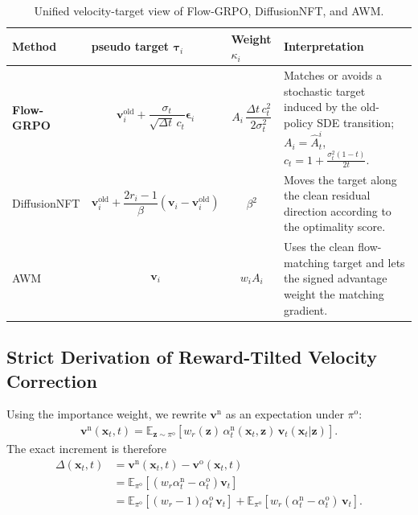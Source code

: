 \documentclass{article} %
\begin{document}
\begin{table}[H]
\centering
\caption{Unified velocity-target view of Flow-GRPO, DiffusionNFT, and AWM.}
\label{tab:velocity_target_comparison}
\renewcommand{\arraystretch}{1.45}
\setlength{\tabcolsep}{5pt}
\small
\begin{tabularx}{\textwidth}{
@{}
>{\bfseries\centering\arraybackslash}m{}
>{\centering\arraybackslash}m{}
>{\centering\arraybackslash}m{}
Y
@{}}
\toprule
Method
&
pseudo target $\mathbf{\tau}_i$
&
Weight $\kappa_i$
&
Interpretation
\\
\midrule

Flow-GRPO
&
\[
\mathbf{v}_i^{\mathrm{old}}
+
\frac{\sigma_t}{\sqrt{\Delta t}\,c_t}
\boldsymbol{\epsilon}_i
\]
&
\[
A_i\,
\frac{\Delta t\,c_t^2}{2\sigma_t^2}
\]
&
Matches or avoids a stochastic target induced by the old-policy SDE transition;
$A_i=\hat A^i_t$, $c_t=1+\frac{\sigma_t^2(1-t)}{2t}$.
\\

\midrule

DiffusionNFT
&
\[
\mathbf{v}_i^{\mathrm{old}}
+
\frac{2r_i-1}{\beta}
\left(
\mathbf{v}_i-\mathbf{v}_i^{\mathrm{old}}
\right)
\]
&
\[
\beta^2
\]
&
Moves the target along the clean residual direction according to the optimality score.
\\

\midrule

AWM
&
\[
\mathbf{v}_i
\]
&
\[
w_i A_i
\]
&
Uses the clean flow-matching target and lets the signed advantage weight the matching gradient.
\\

\bottomrule
\end{tabularx}
\end{table}

\subsection{Strict Derivation of Reward-Tilted Velocity Correction}
\label{sec:strict_correction}


Using the importance weight, we rewrite $\mathbf{v}^{\mathrm{n}}$ as an
expectation under $\pi^{\mathrm{o}}$:
\begin{align}
\mathbf{v}^{\mathrm{n}}(\mathbf{x}_t,t)
=
\mathbb{E}_{\mathbf{z}\sim\pi^{\mathrm{o}}}
\left[
w_r(\mathbf{z})\,
\alpha_t^{\mathrm{n}}(\mathbf{x}_t,\mathbf{z})\,
\mathbf{v}_t(\mathbf{x}_t|\mathbf{z})
\right].
\end{align}
The exact increment is therefore
\begin{align}
\Delta(\mathbf{x}_t,t)
&=
\mathbf{v}^{\mathrm{n}}(\mathbf{x}_t,t)
-
\mathbf{v}^{\mathrm{o}}(\mathbf{x}_t,t)
\\
&=
\mathbb{E}_{\pi^{\mathrm{o}}}
\left[
\left(
w_r\alpha_t^{\mathrm{n}}
-
\alpha_t^{\mathrm{o}}
\right)
\mathbf{v}_t
\right]
\\
&=
\mathbb{E}_{\pi^{\mathrm{o}}}
\left[
(w_r-1)\alpha_t^{\mathrm{o}}\,
\mathbf{v}_t
\right]
+
\mathbb{E}_{\pi^{\mathrm{o}}}
\left[
w_r(\alpha_t^{\mathrm{n}}-\alpha_t^{\mathrm{o}})\,
\mathbf{v}_t
\right].
\end{align}
\end{document}
